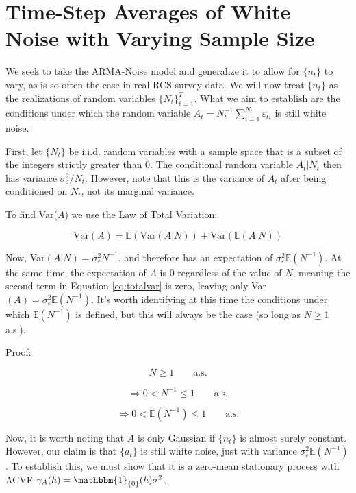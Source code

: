 \section{Time-Step Averages of White Noise with Varying Sample Size}

We seek to take the ARMA-Noise model and generalize it to allow for $\{n_t\}$ to vary, as is so often the case in real RCS survey data. We will now treat $\{n_t\}$ as the realizations of random variables $\{N_t\}_{t=1}^T$. What we aim to establish are the conditions under which the random variable $A_t = N_t^{-1}\sum_{i=1}^{N_t}\varepsilon_{ti}$ is still white noise.

First, let $\{N_t\}$ be i.i.d. random variables with a sample space that is a subset of the integers strictly greater than $0$. The conditional random variable $A_t|N_t$ then has variance $\sigma_\varepsilon^2/N_t$. However, note that this is the variance of $A_t$ after being conditioned on $N_t$, not its marginal variance. 

To find Var($A$) we use the Law of Total Variation:

\begin{equation}
    \label{eq:totalvar}
    \text{Var}(A) = \mathbb{E}(\text{Var}(A|N)) + \text{Var}(\mathbb{E}(A|N))
\end{equation}

Now, Var$(A|N) = \sigma_\varepsilon^2N^{-1}$, and therefore has an expectation of $\sigma_\varepsilon^2\mathbb{E}(N^{-1})$. At the same time, the expectation of $A$ is $0$ regardless of the value of $N$, meaning the second term in Equation \ref{eq:totalvar} is zero, leaving only Var$(A) = \sigma_\varepsilon^2\mathbb{E}(N^{-1})$. It's worth identifying at this time the conditions under which $\mathbb{E}(N^{-1})$ is defined, but this will always be the case (so long as $N \geq 1$ a.s.).

Proof:

$$ N \geq 1 \qquad \text{a.s.} $$

$$ \Rightarrow0 < N^{-1} \leq 1 \qquad \text{a.s.}  $$

$$ \Rightarrow 0 < \mathbb{E}(N^{-1}) \leq 1 \qquad \text{a.s.}  $$


Now, it is worth noting that $A$ is only Gaussian if $\{n_t\}$ is almost surely constant. However, our claim is that $\{a_t\}$ is still white noise, just with variance $\sigma_\varepsilon^2\mathbb{E}(N^{-1})$. To establish this, we must show that it is a zero-mean stationary process with ACVF $\gamma_A(h) = \mathbbm{1}_{\{0\}}(h)\sigma^2$.

